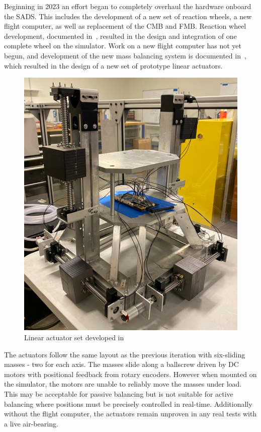 Beginning in 2023 an effort began to completely overhaul the hardware onboard the SADS. This includes the development of a new set of reaction wheels, a new flight computer, as well as replacement of the CMB and FMB. Reaction wheel development, documented in~\cite{nalley2025development}, resulted in the design and integration of one complete wheel on the simulator. Work on a new flight computer has not yet begun, and development of the new mass balancing system is documented in~\cite{gilman_automatic_2024}, which resulted in the design of a new set of prototype linear actuators. 
\begin{figure}[h]\label{fig:gillman_final_work}
    \centering
    \includegraphics[width=0.70\linewidth]{figures/gillman_final_work.png}
    \caption{Linear actuator set developed in~\cite{gilman_automatic_2024}}
\end{figure}
The actuators follow the same layout as the previous iteration with six-sliding masses - two for each axis. The masses slide along a ballscrew driven by DC motors with positional feedback from rotary encoders. However when mounted on the simulator, the motors are unable to reliably move the masses under load. This may be acceptable for passive balancing but is not suitable for active balancing where positions must be precisely controlled in real-time. Additionally without the flight computer, the actuators remain unproven in any real tests with a live air-bearing. 

